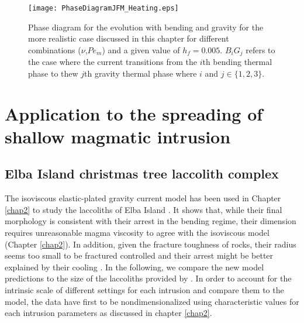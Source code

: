 \begin{figure}[h!]
  \begin{center}
    \graphicspath{ {/Users/thorey/Documents/These/Projet/Refroidissement/Skin_Model/Figure/Figure_Heating/} }
    \texttt{[image: PhaseDiagramJFM\_Heating.eps]}
    \caption{Phase diagram for the  evolution with bending and gravity
      for  the  more realistic  case  discussed  in this  chapter  for
      different  combinations  ($\nu$,$Pe_m$)  and a  given  value  of
      $h_f =  0.005$.  $B_iG_j$ refers  to the case where  the current
      transitions from the  $i$th bending thermal phase  to thew $j$th
      gravity thermal phase where $i$ and $j \in \{1,2,3\}$.}
    \label{C4-Phase_Diagram_Heating}
  \end{center}
\end{figure}

\section{Application to the spreading of shallow magmatic intrusion}
\label{C4-sec:appl-spre-shall}

\subsection{Elba Island christmas tree laccolith complex}
\label{C4-sec:appl-arrest-terr}

The isoviscous elastic-plated  gravity current model has  been used in
Chapter   \ref{chap2}  to   study  the   laccoliths  of   Elba  Island
\citep{Michaut:2011kg}. It shows that, while their final morphology is
consistent with  their arrest in  the bending regime,  their dimension
requires  unreasonable magma  viscosity to  agree with  the isoviscous
model  (Chapter   \ref{chap2}).   In  addition,  given   the  fracture
toughness  of rocks,  their radius  seems  too small  to be  fractured
controlled and their arrest might be better explained by their cooling
\citep{Michaut:2011kg}.  In  the following,  we compare the  new model
predictions   to   the   size    of   the   laccoliths   provided   by
\citet{Rocchi:2002jy}.  In order to account for the intrinsic scale of
different settings for  each intrusion and compare them  to the model,
the  data have  first  to be  nondimensionalized using  characteristic
values  for   each  intrusion  parameters  as   discussed  in  chapter
\ref{chap2}.

